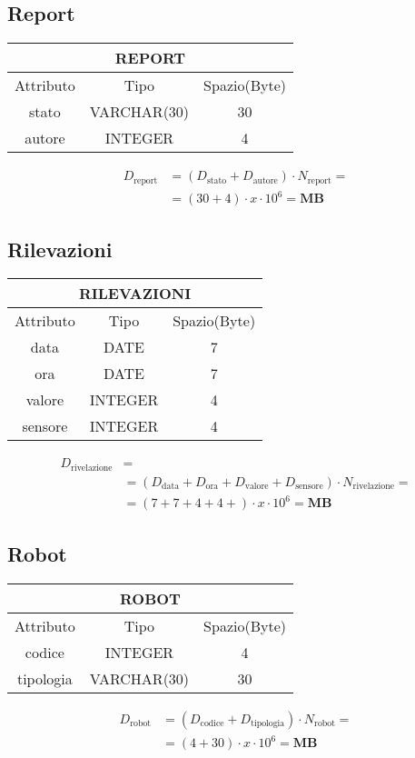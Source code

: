 \subsection{Report}
\begin{tabular}{|c|c|c|}
  \hline
  \multicolumn{3}{|c|}{\textbf{REPORT}}\\
  \hline
  Attributo & Tipo & Spazio(Byte) \\
  \hline
  stato & VARCHAR(30) & 30 \\
  autore & INTEGER & 4\\
  \hline
\end{tabular}
\begin{equation}
  \begin{aligned}
    D_{\text{report}} &=(D_{\text{stato}}+D_{\text{autore}})\cdot N_{\text{report}}=\\
    &=(30+4)\cdot x\cdot 10^6= \textbf{MB}
  \end{aligned}
\end{equation}
\subsection{Rilevazioni}
\begin{tabular}{|c|c|c|}
  \hline
  \multicolumn{3}{|c|}{\textbf{RILEVAZIONI}}\\
  \hline
  Attributo & Tipo & Spazio(Byte) \\
  \hline
  data & DATE & 7 \\
  ora & DATE &  7 \\
  valore & INTEGER & 4 \\
  sensore & INTEGER & 4 \\
  \hline
\end{tabular}
\begin{equation}
  \begin{aligned}
    D_{\text{rivelazione}} &=\\
    &=(D_{\text{data}}+D_{\text{ora}}+D_{\text{valore}}+D_{\text{sensore}})\cdot N_{\text{rivelazione}}=\\
    &=(7+7+4+4+)\cdot x\cdot 10^6= \textbf{MB}
  \end{aligned}
\end{equation}
\subsection{Robot}
\begin{tabular}{ |c|c|c|}
  \hline
  \multicolumn{3}{|c|}{\textbf{ROBOT}}\\
  \hline
  Attributo & Tipo & Spazio(Byte) \\
  \hline
  codice & INTEGER & 4\\
  tipologia & VARCHAR(30) & 30\\
  \hline
\end{tabular}
\begin{equation}
  \begin{aligned}
    D_{\text{robot}} &=(D_{\text{codice}}+D_{\text{tipologia}})\cdot N_{\text{robot}}=\\
    &=(4+30)\cdot x\cdot 10^6= \textbf{MB}
  \end{aligned}
\end{equation}
